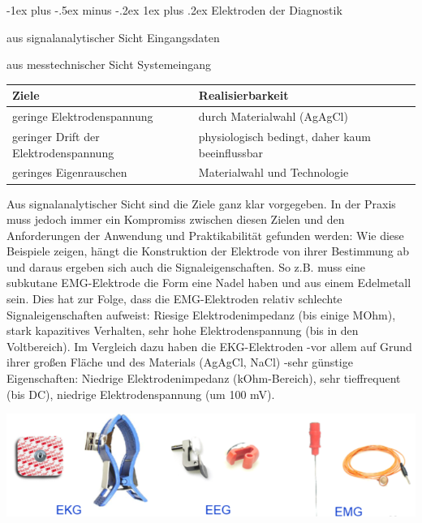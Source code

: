 \documentclass[a4paper]{article}
\makeatletter
\renewcommand{\subsubsection}{\@startsection{subsubsection}{3}{0mm}%
 {-1ex plus -.5ex minus -.2ex}%
 {1ex plus .2ex}%
 {\normalfont\small\bfseries}}
\makeatother
\begin{document}
\begin{multicols}{3}
  \subsubsection{Elektroden der Diagnostik}\label{elektroden-der-diagnostik}

  \begin{itemize*}
    \item aus signalanalytischer Sicht Eingangsdaten
    \item aus messtechnischer Sicht Systemeingang
  \end{itemize*}

  \begin{tabular}{l|l}
    Ziele                                 & Realisierbarkeit                                \\\hline
    geringe Elektrodenspannung            & durch Materialwahl (AgAgCl)                     \\
    geringer Drift der Elektrodenspannung & physiologisch bedingt, daher kaum beeinflussbar \\
    geringes Eigenrauschen                & Materialwahl und Technologie                    \\
  \end{tabular}

  Aus signalanalytischer Sicht sind die Ziele ganz klar vorgegeben. In der
  Praxis muss jedoch immer ein Kompromiss zwischen diesen Zielen und den
  Anforderungen der Anwendung und Praktikabilität gefunden werden: Wie
  diese Beispiele zeigen, hängt die Konstruktion der Elektrode von ihrer
  Bestimmung ab und daraus ergeben sich auch die Signaleigenschaften. So
  z.B. muss eine subkutane EMG-Elektrode die Form eine Nadel haben und aus
  einem Edelmetall sein. Dies hat zur Folge, dass die EMG-Elektroden
  relativ schlechte Signaleigenschaften aufweist: Riesige
  Elektrodenimpedanz (bis einige MOhm), stark kapazitives Verhalten, sehr
  hohe Elektrodenspannung (bis in den Voltbereich). Im Vergleich dazu
  haben die EKG-Elektroden -vor allem auf Grund ihrer großen Fläche und
  des Materials (AgAgCl, NaCl) -sehr günstige Eigenschaften: Niedrige
  Elektrodenimpedanz (kOhm-Bereich), sehr tieffrequent (bis DC), niedrige
  Elektrodenspannung (um 100 mV).

  \includegraphics[width=.5\linewidth]{Assets/Biosignalverarbeitung-elektroden.png}


\end{multicols}
\end{document}
